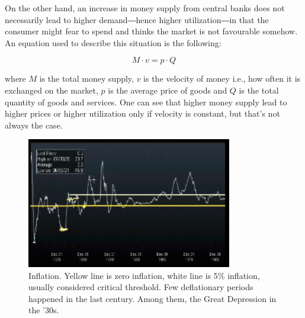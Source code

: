 On the other hand, an increase in money supply from central banks does not necessarily lead to higher demand―hence higher utilization―in that the consumer might fear to spend and thinks the market is not favourable somehow.
An equation used to describe this situation is the following:

\begin{equation}\label{eq:money_supply}
M \cdot v = p \cdot Q
\end{equation}

where $M$ is the total money supply, $v$ is the velocity of money i.e., how often it is exchanged on the market, $p$ is the average price of goods and $Q$ is the total quantity of goods and services. One can see that higher money supply lead to higher prices or higher utilization only if velocity is constant, but that's not always the case.


\begin{figure}[h!]
\centering
\includegraphics[width=0.8\textwidth]{images/deflation_inflation.png}
\caption{Inflation. Yellow line is zero inflation, white line is 5\% inflation, usually considered critical threshold. Few deflationary periods happened in the last century. Among them, the Great Depression in the '30s.}
\label{fig:deflation_inflation}
\end{figure}

